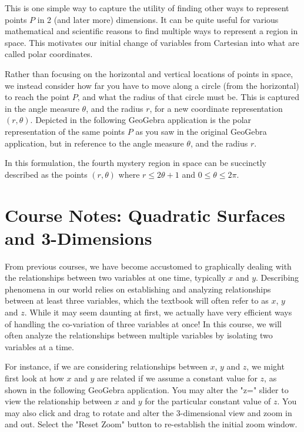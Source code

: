 \documentclass{ximera}
\begin{document}
\begin{center}
\end{center}

This is one simple way to capture the utility of finding other ways to represent points $P$ in 2 (and later more) dimensions. It can be quite useful for various mathematical and scientific reasons to find multiple ways to represent a region in space. This motivates our initial change of variables from Cartesian into what are called polar coordinates.

Rather than focusing on the horizontal and vertical locations of points in space, we instead consider how far you have to move along a circle (from the horizontal) to reach the point $P$, and what the radius of that circle must be. This is captured in the angle measure $\theta$, and the radius $r$, for a new coordinate representation $(r,\theta)$. Depicted in the following GeoGebra application is the polar representation of the same points $P$ as you saw in the original GeoGebra application, but in reference to the angle measure $\theta$, and the radius $r$.

\begin{center}
\end{center}

In this formulation, the fourth mystery region in space can be succinctly described as the points $(r,\theta)$ where $r \leq 2\theta + 1$ and $0 \leq \theta \leq 2\pi$.


\section{Course Notes: Quadratic Surfaces and 3-Dimensions}

From previous courses, we have become accustomed to graphically dealing with the relationships between two variables at one time, typically $x$ and $y$. Describing phenomena in our world relies on establishing and analyzing relationships between at least three variables, which the textbook will often refer to as $x$, $y$ and $z$. While it may seem daunting at first, we actually have very efficient ways of handling the co-variation of three variables at once! In this course, we will often analyze the relationships between multiple variables by isolating two variables at a time.

For instance, if we are considering relationships between $x$, $y$ and $z$, we might first look at how $x$ and $y$ are related if we assume a constant value for $z$, as shown in the following GeoGebra application. You may alter the "z=" slider to view the relationship between $x$ and $y$ for the particular constant value of $z$. You may also click and drag to rotate and alter the 3-dimensional view and zoom in and out. Select the "Reset Zoom" button to re-establish the initial zoom window.
\end{document}
